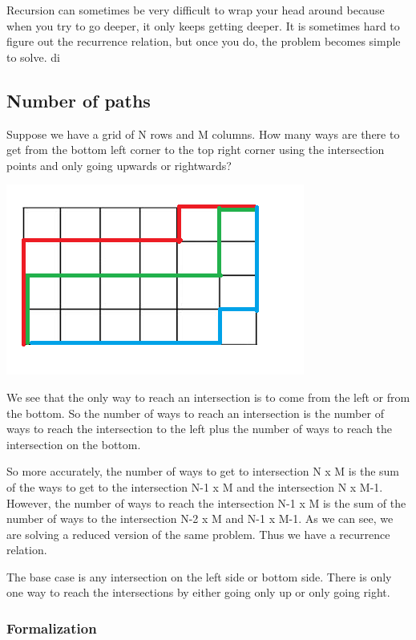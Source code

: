 \documentclass[11pt,oneside]{book}
\makeatletter
\def\maxwidth#1{\ifdim\Gin@nat@width>#1 #1\else\Gin@nat@width\fi}
\makeatother
\begin{document}
Recursion can sometimes be very difficult to wrap your head around because when you try to go deeper, it only keeps getting deeper. It is sometimes hard to figure out the recurrence relation, but once you do, the problem becomes simple to solve.
di

\subsection{Number of paths}

Suppose we have a grid of N rows and M columns. How many ways are there to get from the bottom left corner to the top right corner using the intersection points and only going upwards or rightwards?

\vspace{5px}\includegraphics[width=\maxwidth{\textwidth}]{recursion_grid.png}

We see that the only way to reach an intersection is to come from the left or from the bottom. So the number of ways to reach an intersection is the number of ways to reach the intersection to the left plus the number of ways to reach the intersection on the bottom.

So more accurately, the number of ways to get to intersection N x M is the sum of the ways to get to the intersection N-1 x M and the intersection N x M-1. However, the number of ways to reach the intersection N-1 x M is the sum of the number of ways to the intersection N-2 x M and N-1 x M-1. As we can see, we are solving a reduced version of the same problem. Thus we have a recurrence relation.

The base case is any intersection on the left side or bottom side. There is only one way to reach the intersections by either going only up or only going right.

\subsubsection{Formalization}
\end{document}
